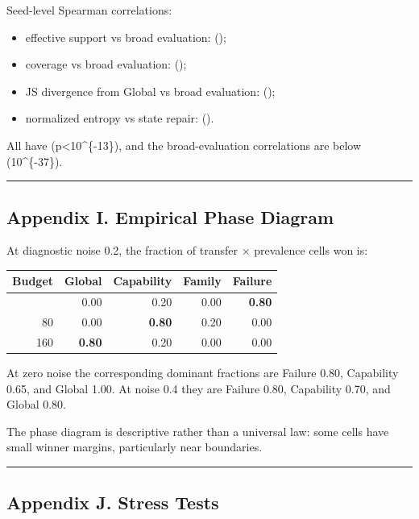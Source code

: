 \documentclass[
]{article}
\providecommand{\tightlist}{%
  \setlength{\itemsep}{0pt}\setlength{\parskip}{0pt}}
\begin{document}
Seed-level Spearman correlations:

\begin{itemize}
\tightlist
\item
  effective support vs broad evaluation: ();
\item
  coverage vs broad evaluation: ();
\item
  JS divergence from Global vs broad evaluation: ();
\item
  normalized entropy vs state repair: ().
\end{itemize}

All have (p\textless10\^{}\{-13\}), and the broad-evaluation
correlations are below (10\^{}\{-37\}).

\begin{center}\rule{0.5\linewidth}{0.5pt}\end{center}

\subsection{Appendix I. Empirical Phase
Diagram}\label{appendix-i.-empirical-phase-diagram}

At diagnostic noise 0.2, the fraction of transfer × prevalence cells won
is:

\begin{longtable}[]{@{}rrrrr@{}}
\toprule\noalign{}
Budget & Global & Capability & Family & Failure \\
\midrule\noalign{}
\endhead
\bottomrule\noalign{}
\endlastfoot
40 & 0.00 & 0.20 & 0.00 & \textbf{0.80} \\
80 & 0.00 & \textbf{0.80} & 0.20 & 0.00 \\
160 & \textbf{0.80} & 0.20 & 0.00 & 0.00 \\
\end{longtable}

At zero noise the corresponding dominant fractions are Failure 0.80,
Capability 0.65, and Global 1.00. At noise 0.4 they are Failure 0.80,
Capability 0.70, and Global 0.80.

The phase diagram is descriptive rather than a universal law: some cells
have small winner margins, particularly near boundaries.

\begin{center}\rule{0.5\linewidth}{0.5pt}\end{center}

\subsection{Appendix J. Stress Tests}\label{appendix-j.-stress-tests}
\end{document}
